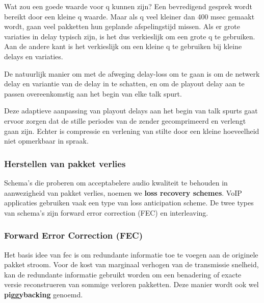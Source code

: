\noindent Wat zou een goede waarde voor q kunnen zijn? Een bevredigend gesprek wordt bereikt door een kleine q waarde. Maar als q veel kleiner dan 400 msec gemaakt wordt, gaan veel pakketten hun geplande afspelingstijd missen. Als er grote variaties in delay typisch zijn, is het dus verkieslijk om een grote q te gebruiken. Aan de andere kant is het verkieslijk om een kleine q te gebruiken bij kleine delays en variaties.


De natuurlijk manier om met de afweging delay-loss om te gaan is om de netwerk delay en variantie van de delay in te schatten, en om de playout delay aan te passen overeenkomstig aan het begin van elke talk spurt. 

\noindent Deze adaptieve aanpassing van playout delays aan het begin van talk spurts gaat ervoor zorgen dat de stille periodes van de zender gecomprimeerd en verlengt gaan zijn. Echter is compressie en verlening van stilte door een kleine hoeveelheid niet opmerkbaar in spraak.

\subsubsection{Herstellen van pakket verlies}

Schema’s die proberen om acceptabelere audio kwaliteit te behouden in aanwezigheid van pakket verlies, noemen we \textbf{loss recovery schemes}. VoIP applicaties gebruiken vaak een type van loss anticipation scheme. De twee types van schema’s zijn forward error correction (FEC) en interleaving.

\subsubsection{Forward Error Correction (FEC)}

\noindent Het basis idee van \acrshort{fec} is om redundante informatie toe te voegen aan de originele pakket stroom. Voor de kost van marginaal verhogen van de transmissie snelheid, kan de redundante informatie gebruikt worden om een benadering of exacte versie reconstrueren van sommige verloren pakketten. Deze manier wordt ook wel \textbf{piggybacking} genoemd.

